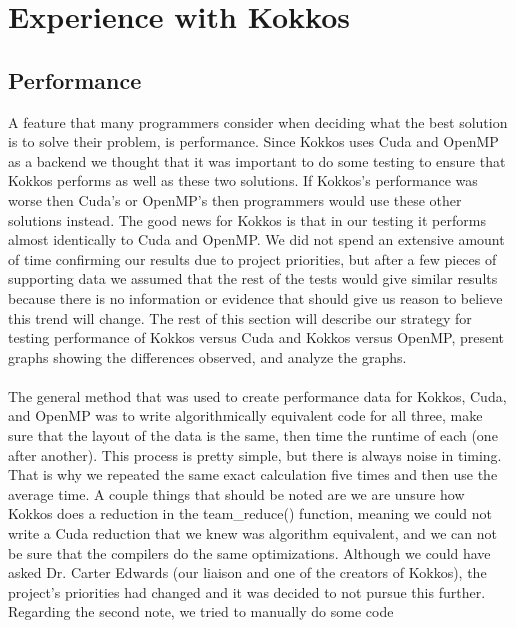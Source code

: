 \chapter{Experience with Kokkos}
\section{Performance}
A feature that many programmers consider when deciding what the best solution is
to solve their problem, is performance. Since Kokkos uses Cuda and OpenMP as a
backend we thought that it was important to do some testing to ensure that
Kokkos performs as well as these two solutions. If Kokkos's performance was
worse then Cuda's or OpenMP's then programmers would use these other solutions
instead. The good news for Kokkos is that in our testing it performs almost
identically to Cuda and OpenMP. We did not spend an extensive amount of time
confirming our results due to project priorities, but after a few pieces of supporting data we assumed that
the rest of the tests would give similar results because there is no information or evidence
that should give us reason to believe this trend will change. The rest of this
section will describe our strategy for testing performance of Kokkos versus Cuda
and Kokkos versus OpenMP, present graphs showing the differences observed, and
analyze the graphs.
\\
\\
The general method that was used to create performance data for Kokkos, Cuda,
and OpenMP was to write algorithmically equivalent code for all three, make sure
that the layout of the data is the same, then time the runtime of each (one
after another). This process is pretty simple, but there is always noise in
timing. That is why we repeated the same exact calculation five times and 
then use the average time. A couple things that should be noted are we are
unsure how Kokkos does a reduction in the team\_reduce() function, meaning we
could not write a Cuda reduction that we knew was algorithm equivalent, and we
can not be sure that the compilers do the same optimizations. Although
we could have asked Dr. Carter Edwards (our liaison and one of the creators of 
Kokkos), the project's priorities had changed and it was decided to not pursue
this further. Regarding the second note, we tried to manually do some code
